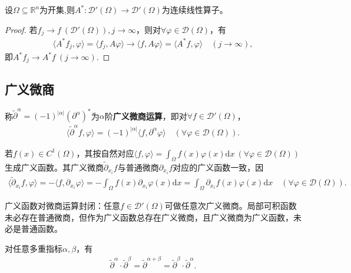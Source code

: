 \documentclass[../../main.tex]{subfiles}%
\begin{document}
\begin{proposition}
设$\Omega\subseteq\mathbb{R}^n$为开集,则$A^*:\mathscr{D}'(\Omega)\to\mathscr{D}'(\Omega)$为连续线性算子。
\end{proposition}
\begin{proof}
若$f_j\to f\ (\mathscr{D}'(\Omega)),j\to\infty$，则对$\forall\varphi\in\mathscr{D}(\Omega)$，有
\begin{align*}
\langle A^*f_j,\varphi\rangle=\langle f_j,A\varphi\rangle\to\langle f,A\varphi\rangle=\langle A^*f,\varphi\rangle\quad(j\to\infty),
\end{align*}
即$A^*f_j\to A^*f\ (j\to\infty)$.
\end{proof}

\subsection{广义微商}
\begin{definition}
称$\widetilde{\partial}^\alpha=(-1)^{|\alpha|}(\partial^\alpha)^*$为$\alpha$阶\textbf{广义微商运算}，即对$\forall f\in\mathscr{D}'(\Omega)$，
\begin{align*}
\langle\widetilde{\partial}^\alpha f,\varphi\rangle=(-1)^{|\alpha|}\langle f,\partial^\alpha\varphi\rangle\quad(\forall\varphi\in\mathscr{D}(\Omega)).
\end{align*}
\end{definition}

\begin{remark}
若$f(x)\in C^1(\Omega)$，其按自然对应$\langle f,\varphi\rangle=\int_{\Omega}f(x)\varphi(x)\mathrm{d}x\ (\forall\varphi\in\mathscr{D}(\Omega))$生成广义函数。其广义微商$\widetilde{\partial}_{x_i}f$与普通微商$\partial_{x_i}f$对应的广义函数一致，因
\begin{align*}
\langle\widetilde{\partial}_{x_i}f,\varphi\rangle=-\langle f,\partial_{x_i}\varphi\rangle=-\int_{\Omega}f(x)\partial_{x_i}\varphi(x)\mathrm{d}x=\int_{\Omega}\partial_{x_i}f(x)\varphi(x)\mathrm{d}x\quad(\forall\varphi\in\mathscr{D}(\Omega)).
\end{align*}
\end{remark}

\begin{remark}
广义函数对微商运算封闭：任意$f\in\mathscr{D}'(\Omega)$可做任意次广义微商。局部可积函数未必存在普通微商，但作为广义函数总存在广义微商，且广义微商为广义函数，未必是普通函数。
\end{remark}

\begin{remark}
对任意多重指标$\alpha,\beta$，有
\begin{align*}
\widetilde{\partial}^\alpha\cdot\widetilde{\partial}^\beta=\widetilde{\partial}^{\alpha+\beta}=\widetilde{\partial}^\beta\cdot\widetilde{\partial}^\alpha.
\end{align*}
\end{remark}
\end{document}
